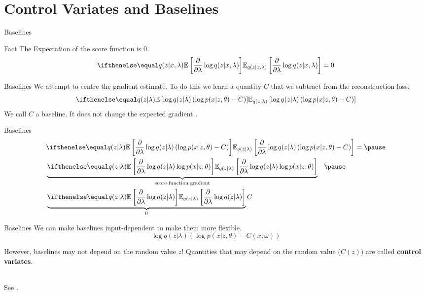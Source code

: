 \documentclass[14pt]{beamer}
\begin{document}
\section{Control Variates and Baselines}

\begin{frame}
\tableofcontents[currentsection]
\end{frame}

\begin{frame}{Baselines}
\begin{block}{Fact}
The Expectation of the score function is 0. 
\pause
\begin{equation*}
\E[q(z|x,\lambda)]{\pdv{\lambda} \log q(z|x,\lambda)} = 0
\end{equation*}
\end{block}
\end{frame}

\begin{frame}{Baselines}
We attempt to centre the gradient estimate. To do this we learn a quantity $ C $ that we subtract
from the reconstruction loss.
\begin{equation*}
\E[q(z|\lambda) ]{\log q(z|\lambda) \left( \log p(x|z,\theta) - C \right)}
\end{equation*}
We call $ C $ a baseline. It does not change the expected gradient \citep{Williams:1992}.
\end{frame}

\begin{frame}{Baselines}
 \begin{equation*}
\begin{aligned}
&\E[q(z|\lambda)]{\pdv{\lambda}\log q(z|\lambda) \left( \log p(x|z,\theta) - C \right)} = \pause \\
&\underbrace{\E[q(z|\lambda)]{\pdv{\lambda}\log q(z|\lambda)  \log p(x|z,\theta)}}_{\text{score function gradient}}  -
\pause \\
&\underbrace{\E[q(z|\lambda)]{\pdv{\lambda}\log q(z|\lambda)}}_{0}C
\end{aligned}
\end{equation*}
\end{frame}

\begin{frame}{Baselines}
We can make baselines input-dependent to make them more flexible.
\begin{equation*}
\log q(z|\lambda) \left( \log p(x|z,\theta) - C(x; \omega) \right)
\end{equation*}

\pause

However, baselines may not depend on the random value $ z $! Quantities that may depend on the
random value ($ C(z) $) are called \textbf{control variates}. \\

~

See \cite{PaisleyEtAl:2012, RanganathEtAl:2014,GregorEtAl:2014}.
\end{frame}
\end{document}
